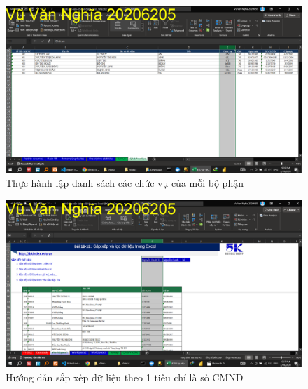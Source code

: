 \documentclass{article}
\begin{document}
\begin{figure}[h]
    \centering
    \includegraphics[scale = 0.15]{Video1/ThucHanh/6.png}
    \caption{Thực hành lập danh sách các chức vụ của mỗi bộ phận}
\end{figure}

\begin{figure}[h]
    \centering
    \includegraphics[scale = 0.15]{Video2/HuongDan/0.png}
    \caption{Hướng dẫn sắp xếp dữ liệu theo 1 tiêu chí là số CMND}
\end{figure}
\end{document}
